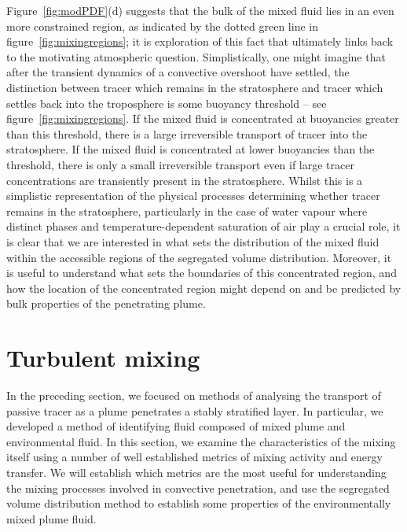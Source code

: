 \documentclass[a4paper]{article}
\begin{document}
Figure~\ref{fig:modPDF}(d) suggests that the bulk of the mixed fluid lies in an even more constrained region,
as indicated by the dotted green line in figure~\ref{fig:mixingregions}; it is exploration of this fact that
ultimately links back to the motivating atmospheric question. Simplistically, one might imagine that after
the transient dynamics of a convective overshoot have settled, the distinction between tracer which remains in
the stratosphere and tracer which settles back into the troposphere is some buoyancy threshold -- see
figure~\ref{fig:mixingregions}. If the mixed fluid is concentrated at buoyancies greater than this threshold,
there is a large irreversible transport of tracer into the stratosphere. If the mixed fluid is concentrated at
lower buoyancies than the threshold, there is only a small irreversible transport even if large tracer
concentrations are transiently present in the stratosphere. Whilst this is a simplistic representation of the
physical processes determining whether tracer remains in the stratosphere, particularly in the case of water
vapour where distinct phases and temperature-dependent saturation of air play a crucial role, it is clear
that we are interested in what sets the distribution of the mixed fluid within the accessible regions of the
segregated volume distribution. Moreover, it is useful to understand what sets the boundaries of this
concentrated region, and how the location of the concentrated region might depend on and be predicted by bulk
properties of the penetrating plume.


\section{Turbulent mixing}
\label{sec:turbmix}
In the preceding section, we focused on methods of analysing the transport of passive tracer as a plume
penetrates a stably stratified layer. In particular, we developed a method of identifying fluid composed of
mixed plume and environmental fluid. In this section, we examine the characteristics of the mixing itself
using a number of well established metrics of mixing activity and energy transfer. We will establish which
metrics are the most useful for understanding the mixing processes involved in convective penetration, and use
the segregated volume distribution method to establish some properties of the environmentally mixed plume fluid.
\end{document}
